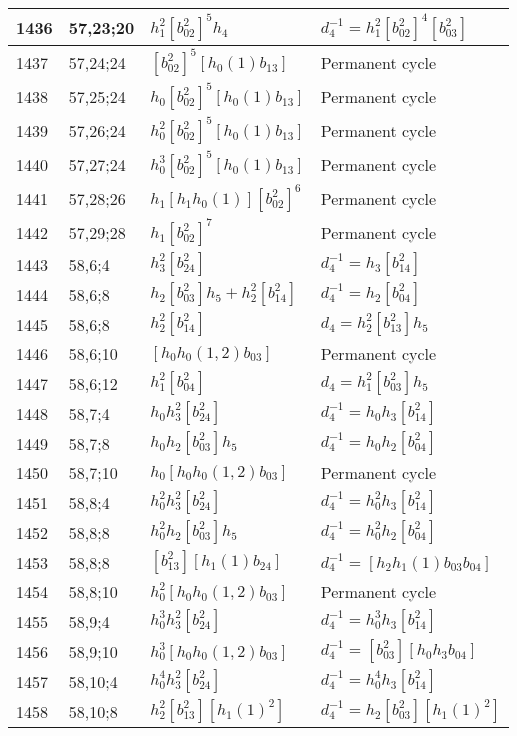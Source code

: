 \documentclass{article}
\begin{document}
\begin{longtable}{|l|l|>{\raggedright\arraybackslash}p{6cm}|>{\raggedright\arraybackslash}p{6cm}|}
\hline
1436 & 57,23;20 & $h_1^2[b_{02}^2]^5h_4$ & $d_{4}^{-1}=h_1^2[b_{02}^2]^4[b_{03}^2]$\\
\hline
1437 & 57,24;24 & $[b_{02}^2]^5[h_0(1)b_{13}]$ & Permanent cycle\\
\hline
1438 & 57,25;24 & $h_0[b_{02}^2]^5[h_0(1)b_{13}]$ & Permanent cycle\\
\hline
1439 & 57,26;24 & $h_0^2[b_{02}^2]^5[h_0(1)b_{13}]$ & Permanent cycle\\
\hline
1440 & 57,27;24 & $h_0^3[b_{02}^2]^5[h_0(1)b_{13}]$ & Permanent cycle\\
\hline
1441 & 57,28;26 & $h_1[h_1h_0(1)][b_{02}^2]^6$ & Permanent cycle\\
\hline
1442 & 57,29;28 & $h_1[b_{02}^2]^7$ & Permanent cycle\\
\hline
1443 & 58,6;4 & $h_3^2[b_{24}^2]$ & $d_{4}^{-1}=h_3[b_{14}^2]$\\
\hline
1444 & 58,6;8 & $h_2[b_{03}^2]h_5 + h_2^2[b_{14}^2]$ & $d_{4}^{-1}=h_2[b_{04}^2]$\\
1445 & 58,6;8 & $h_2^2[b_{14}^2]$ &$d_{4}=h_2^2[b_{13}^2]h_5$\\
\hline
1446 & 58,6;10 & $[h_0h_0(1, 2)b_{03}]$ & Permanent cycle\\
\hline
1447 & 58,6;12 & $h_1^2[b_{04}^2]$ &$d_{4}=h_1^2[b_{03}^2]h_5$\\
\hline
1448 & 58,7;4 & $h_0h_3^2[b_{24}^2]$ & $d_{4}^{-1}=h_0h_3[b_{14}^2]$\\
\hline
1449 & 58,7;8 & $h_0h_2[b_{03}^2]h_5$ & $d_{4}^{-1}=h_0h_2[b_{04}^2]$\\
\hline
1450 & 58,7;10 & $h_0[h_0h_0(1, 2)b_{03}]$ & Permanent cycle\\
\hline
1451 & 58,8;4 & $h_0^2h_3^2[b_{24}^2]$ & $d_{4}^{-1}=h_0^2h_3[b_{14}^2]$\\
\hline
1452 & 58,8;8 & $h_0^2h_2[b_{03}^2]h_5$ & $d_{4}^{-1}=h_0^2h_2[b_{04}^2]$\\
1453 & 58,8;8 & $[b_{13}^2][h_1(1)b_{24}]$ & $d_{4}^{-1}=[h_2h_1(1)b_{03}b_{04}]$\\
\hline
1454 & 58,8;10 & $h_0^2[h_0h_0(1, 2)b_{03}]$ & Permanent cycle\\
\hline
1455 & 58,9;4 & $h_0^3h_3^2[b_{24}^2]$ & $d_{4}^{-1}=h_0^3h_3[b_{14}^2]$\\
\hline
1456 & 58,9;10 & $h_0^3[h_0h_0(1, 2)b_{03}]$ & $d_{4}^{-1}=[b_{03}^2][h_0h_3b_{04}]$\\
\hline
1457 & 58,10;4 & $h_0^4h_3^2[b_{24}^2]$ & $d_{4}^{-1}=h_0^4h_3[b_{14}^2]$\\
\hline
1458 & 58,10;8 & $h_2^2[b_{13}^2][h_1(1)^2]$ & $d_{4}^{-1}=h_2[b_{03}^2][h_1(1)^2]$\\

\end{longtable}
\end{document}
